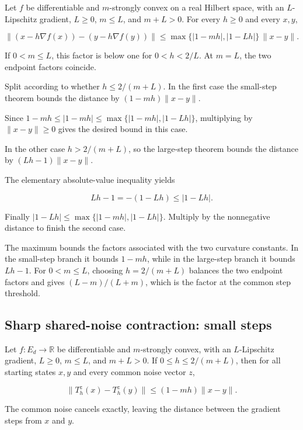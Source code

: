 \documentclass[11pt,a4paper]{report}
\begin{document}
Let \(f\) be differentiable and \(m\)-strongly convex on a real Hilbert space, with an \(L\)-Lipschitz gradient, \(L\ge0\), \(m\le L\), and \(m+L>0\). For every \(h\ge0\) and every \(x,y\),

\[\|(x-h\nabla f(x))-(y-h\nabla f(y))\|\le\max\{|1-mh|,|1-Lh|\}\,\|x-y\|.\]

If \(0<m\le L\), this factor is below one for \(0<h<2/L\). At \(m=L\), the two endpoint factors coincide.



Split according to whether \(h\le2/(m+L)\). In the first case the small-step theorem bounds the distance by \((1-mh)\|x-y\|\).



Since \(1-mh\le|1-mh|\le\max\{|1-mh|,|1-Lh|\}\), multiplying by \(\|x-y\|\ge0\) gives the desired bound in this case.



In the other case \(h>2/(m+L)\), so the large-step theorem bounds the distance by \((Lh-1)\|x-y\|\).



The elementary absolute-value inequality yields

\[Lh-1=-(1-Lh)\le|1-Lh|.\]

Finally \(|1-Lh|\le\max\{|1-mh|,|1-Lh|\}\). Multiply by the nonnegative distance to finish the second case.



The maximum bounds the factors associated with the two curvature constants. In the small-step branch it bounds \(1-mh\), while in the large-step branch it bounds \(Lh-1\). For \(0<m\le L\), choosing \(h=2/(m+L)\) balances the two endpoint factors and gives \((L-m)/(L+m)\), which is the factor at the common step threshold.

\subsection{\texorpdfstring{Sharp shared-noise contraction: small steps}{Sharp shared-noise contraction: small steps}}
\label{report-step-UnadjustedLangevin-SharpContraction-lean-10}


Let \(f:E_d\to\mathbb R\) be differentiable and \(m\)-strongly convex, with an \(L\)-Lipschitz gradient, \(L\ge0\), \(m\le L\), and \(m+L>0\). If \(0\le h\le2/(m+L)\), then for all starting states \(x,y\) and every common noise vector \(z\),

\[\|T_h^z(x)-T_h^z(y)\|\le(1-mh)\|x-y\|.\]

The common noise cancels exactly, leaving the distance between the gradient steps from \(x\) and \(y\).
\end{document}
